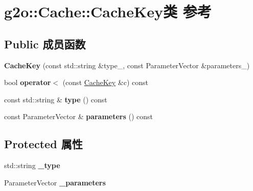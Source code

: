 \hypertarget{classg2o_1_1Cache_1_1CacheKey}{\section{g2o\-:\-:Cache\-:\-:Cache\-Key类 参考}
\label{classg2o_1_1Cache_1_1CacheKey}
}
\subsection*{Public 成员函数}
\begin{DoxyCompactItemize}
\item 
\hypertarget{classg2o_1_1Cache_1_1CacheKey_a363ba06fe3b3f17acd664b0706ba3270}{{\bfseries Cache\-Key} (const std\-::string \&type\-\_\-, const Parameter\-Vector \&parameters\-\_\-)}\label{classg2o_1_1Cache_1_1CacheKey_a363ba06fe3b3f17acd664b0706ba3270}

\item 
\hypertarget{classg2o_1_1Cache_1_1CacheKey_a4a6e782eeee8c5300abe0fd5a89ed6a8}{bool {\bfseries operator$<$} (const \hyperlink{classg2o_1_1Cache_1_1CacheKey}{Cache\-Key} \&c) const }\label{classg2o_1_1Cache_1_1CacheKey_a4a6e782eeee8c5300abe0fd5a89ed6a8}

\item 
\hypertarget{classg2o_1_1Cache_1_1CacheKey_aea8a503e67d00d2376a5435c1d05be99}{const std\-::string \& {\bfseries type} () const }\label{classg2o_1_1Cache_1_1CacheKey_aea8a503e67d00d2376a5435c1d05be99}

\item 
\hypertarget{classg2o_1_1Cache_1_1CacheKey_ac872928298c0b413e152efd04e22cda6}{const Parameter\-Vector \& {\bfseries parameters} () const }\label{classg2o_1_1Cache_1_1CacheKey_ac872928298c0b413e152efd04e22cda6}

\end{DoxyCompactItemize}
\subsection*{Protected 属性}
\begin{DoxyCompactItemize}
\item 
\hypertarget{classg2o_1_1Cache_1_1CacheKey_a886ec6cf583561cb791cbaff902c673d}{std\-::string {\bfseries \-\_\-type}}\label{classg2o_1_1Cache_1_1CacheKey_a886ec6cf583561cb791cbaff902c673d}

\item 
\hypertarget{classg2o_1_1Cache_1_1CacheKey_a3f8dc2307bd1d174a30bdc8443a8d152}{Parameter\-Vector {\bfseries \-\_\-parameters}}\label{classg2o_1_1Cache_1_1CacheKey_a3f8dc2307bd1d174a30bdc8443a8d152}

\end{DoxyCompactItemize}
